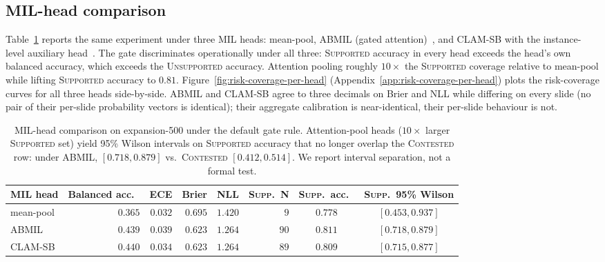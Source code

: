 \documentclass{article}
\newcommand{\SafeNum}[1]{#1}
\begin{document}
\subsection{MIL-head comparison}
\label{sec:mil-comparison}

Table~\ref{tab:mil-comparison} reports the same experiment under three MIL heads: mean-pool, ABMIL (gated attention)~\citep{ilse2018attention}, and CLAM-SB with the instance-level auxiliary head~\citep{lu2021clam}. The gate discriminates operationally under all three: \textsc{Supported} accuracy in every head exceeds the head's own balanced accuracy, which exceeds the \textsc{Unsupported} accuracy. Attention pooling roughly $\SafeNum{10}\times$ the \textsc{Supported} coverage relative to mean-pool while lifting \textsc{Supported} accuracy to $\SafeNum{0.81}$. Figure~\ref{fig:risk-coverage-per-head} (Appendix~\ref{app:risk-coverage-per-head}) plots the risk-coverage curves for all three heads side-by-side. ABMIL and CLAM-SB agree to three decimals on Brier and NLL while differing on every slide (no pair of their per-slide probability vectors is identical); their aggregate calibration is near-identical, their per-slide behaviour is not.

\begin{table}[t]
\centering
\caption{MIL-head comparison on expansion-500 under the default gate rule. Attention-pool heads ($\SafeNum{10}\times$ larger \textsc{Supported} set) yield \SafeNum{95\%} Wilson intervals on \textsc{Supported} accuracy that no longer overlap the \textsc{Contested} row: under ABMIL, $[\SafeNum{0.718}, \SafeNum{0.879}]$ vs.\ \textsc{Contested} $[\SafeNum{0.412}, \SafeNum{0.514}]$. We report interval separation, not a formal test.}
\label{tab:mil-comparison}
\setlength{\tabcolsep}{4pt}
\small
\begin{tabular}{@{}lrrrrrcc@{}}
\toprule
MIL head & Balanced acc.\ & ECE & Brier & NLL & \textsc{Supp.}\ N & \textsc{Supp.}\ acc.\ & \textsc{Supp.}\ \SafeNum{95\%} Wilson\\
\midrule
mean-pool & $\SafeNum{0.365}$ & $\SafeNum{0.032}$ & $\SafeNum{0.695}$ & $\SafeNum{1.420}$ & $\SafeNum{9}$   & $\SafeNum{0.778}$ & $[\SafeNum{0.453}, \SafeNum{0.937}]$ \\
ABMIL     & $\SafeNum{0.439}$ & $\SafeNum{0.039}$ & $\SafeNum{0.623}$ & $\SafeNum{1.264}$ & $\SafeNum{90}$  & $\SafeNum{0.811}$ & $[\SafeNum{0.718}, \SafeNum{0.879}]$ \\
CLAM-SB   & $\SafeNum{0.440}$ & $\SafeNum{0.034}$ & $\SafeNum{0.623}$ & $\SafeNum{1.264}$ & $\SafeNum{89}$  & $\SafeNum{0.809}$ & $[\SafeNum{0.715}, \SafeNum{0.877}]$ \\
\bottomrule
\end{tabular}
\end{table}
\end{document}
